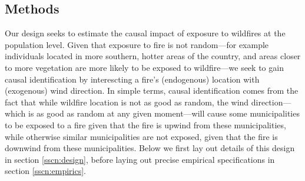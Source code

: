 \documentclass[11pt]{article}
\begin{document}
\begin{spacing}{1.3}



\section{Methods}
\label{scn:methods}
Our design seeks to estimate the causal impact of exposure to wildfires at the population level.  Given that exposure to fire is not random---for example individuals located in more southern, hotter areas of the country, and areas closer to more vegetation are more likely to be exposed to wildfire---we seek to gain causal identification by interescting a fire's (endogenous) location with (exogenous) wind direction.  In simple terms, causal identification comes from the fact that while wildfire location is not as good as random, the wind direction---which is as good as random at any given moment---will cause some municipalities to be exposed to a fire given that the fire is upwind from these municipalities, while otherwise similar municipalities are not exposed, given that the fire is downwind from these municipalities.  Below we first lay out details of this design in section \ref{sscn:design}, before laying out precise empirical specifications in section \ref{sscn:empirics}.


\end{spacing}
\end{document}
